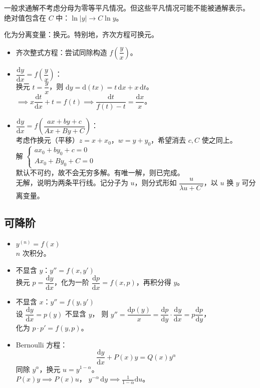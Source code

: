 \documentclass[12pt, a4paper, UTF8, openany]{ctexbook}
\newcommand{\dif}{\mathrm{d}}
\newcommand{\difx}{\,\mathrm{d}x}
\newcommand{\difk}[2]{{#1}^{(#2)}}
\begin{document}
        一般求通解不考虑分母为零等平凡情况。但这些平凡情况可能不能被通解表示。\\
        绝对值包含在 $C$ 中：$\ln|y| \to C\ln y$。

        化为分离变量：{\heiti 换元}。特别地，{\heiti 齐次}方程可换元。
        \begin{itemize}
            \item 齐次整式方程：尝试同除构造 $f(\dfrac{y}{x})$。
            \item  $\dfrac{\dif y}{\dif x} = f(\dfrac{y}{x})$：\\
                换元 $t = \dfrac{y}{x}$，则 $\dif y = \dif(tx) = t\difx + x\,\dif t$。\\
                $\implies x\dfrac{\dif t}{\dif x} + t = f(t) \implies \dfrac{\dif t}{f(t) - t} = \dfrac{\dif x}{x}$。
            \item $\dfrac{\dif y}{\dif x} = f(\dfrac{ax + by + c}{Ax + By +C})$：\\
                考虑作换元（平移）$z = x + x_0$，$w =  y + y_0$，希望消去 $c, C$ 使之同上。\\
                解 $\begin{cases}
                    ax_0 + by_0 + c = 0 \\
                    Ax_0 + By_0 + C = 0
                \end{cases}$\\
                默认不可约，故不会无穷多解。有唯一解，则已完成。\\
                无解，说明为两条平行线。记分子为 $u$，则分式形如 $\dfrac{u}{\lambda u + C'}$，以 $u$ 换 $y$ 可分离变量。
        \end{itemize}

        \subsection{可降阶}
        \begin{itemize}
            \item $\difk{y}{n} = f(x)$ \\
                $n$ 次积分。
            \item 不显含 $y$：$y'' = f(x, y')$ \\
                换元 $p = \dfrac{\dif y}{\dif x}$，化为一阶 $\dfrac{\dif p}{\dif x} = f(x, p)$，再积分得 $y$。
            \item 不显含 $x$：$y'' = f(y, y')$ \\
                设 $\dfrac{\dif y}{\dif x} = p(y)$ 不显含 $y$，
                则 $y'' = \dfrac{\dif p(y)}{x} = \dfrac{\dif p}{\dif y} \cdot \dfrac{\dif y}{\dif x} 
                        = p\dfrac{\dif p}{\dif y}$，\\
                化为 $p \cdot p' = f(y, p)$。
            \item Bernoulli 方程：$$\frac{\dif y}{\dif x} + P(x)y = Q(x)y^\alpha$$
                同除 $y^\alpha$，换元 $u = y^{1 - \alpha}$。\\
                $P(x)y \implies P(x)u$，
                $y^{-\alpha}\,\dif y \implies \frac{1}{1 - \alpha}\dif u$。
        \end{itemize}
\end{document}
